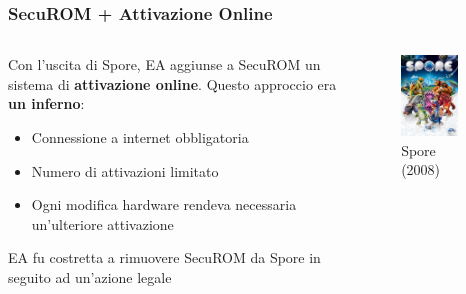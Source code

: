 \documentclass{beamer}
\begin{document}
	\begin{frame}
		\frametitle{SecuROM + Attivazione Online}
		\begin{columns}
			\begin{column}{0.6\textwidth}
				Con l'uscita di Spore, EA aggiunse a SecuROM un sistema di \textbf{attivazione online}.
				Questo approccio era \textbf{un inferno}:
				\begin{itemize}
					\item Connessione a internet obbligatoria
					\item Numero di attivazioni limitato
					\item Ogni modifica hardware rendeva necessaria un'ulteriore attivazione
				\end{itemize}
				EA fu costretta a rimuovere SecuROM da Spore in seguito ad un'azione legale
			\end{column}
			\begin{column}{0.4\textwidth}
				\begin{figure}[h]
					\centering
					\includegraphics[width=0.8\textwidth]{imgs/Sporebox.jpg}
					\caption{Spore (2008)}
				\end{figure}
			\end{column}
		\end{columns}	
	\end{frame}
\end{document}
